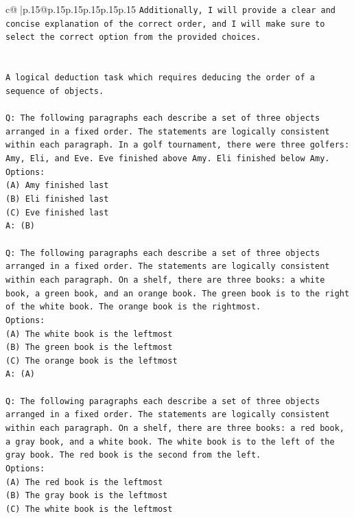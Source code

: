\documentclass{article}
\begin{document}
{\begin{supertabular}{c@{$\;$}|p{.15\linewidth}@{}p{.15\linewidth}p{.15\linewidth}p{.15\linewidth}p{.15\linewidth}p{.15\linewidth}}
{{{\texttt{Additionally, I will provide a clear and concise explanation of the correct order, and I will make sure to select the correct option from the provided choices.} \\
\\ 
\\ 
\texttt{A logical deduction task which requires deducing the order of a sequence of objects.} \\
\\ 
\texttt{Q: The following paragraphs each describe a set of three objects arranged in a fixed order. The statements are logically consistent within each paragraph. In a golf tournament, there were three golfers: Amy, Eli, and Eve. Eve finished above Amy. Eli finished below Amy.} \\
\texttt{Options:} \\
\texttt{(A) Amy finished last} \\
\texttt{(B) Eli finished last} \\
\texttt{(C) Eve finished last} \\
\texttt{A: (B)} \\
\\ 
\texttt{Q: The following paragraphs each describe a set of three objects arranged in a fixed order. The statements are logically consistent within each paragraph. On a shelf, there are three books: a white book, a green book, and an orange book. The green book is to the right of the white book. The orange book is the rightmost.} \\
\texttt{Options:} \\
\texttt{(A) The white book is the leftmost} \\
\texttt{(B) The green book is the leftmost} \\
\texttt{(C) The orange book is the leftmost} \\
\texttt{A: (A)} \\
\\ 
\texttt{Q: The following paragraphs each describe a set of three objects arranged in a fixed order. The statements are logically consistent within each paragraph. On a shelf, there are three books: a red book, a gray book, and a white book. The white book is to the left of the gray book. The red book is the second from the left.} \\
\texttt{Options:} \\
\texttt{(A) The red book is the leftmost} \\
\texttt{(B) The gray book is the leftmost} \\
\texttt{(C) The white book is the leftmost} \\
}}}
\end{supertabular}}
\end{document}
